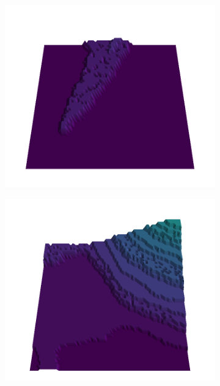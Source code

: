 \documentclass[../document.tex]{subfiles}
\begin{document}
\begin{figure}[H]
    \begin{subfigure}[b]{0.19\textwidth}
        \includegraphics[width=\linewidth]{../img/5/quarry/false_positive//patch-3d-majavi-colormap-0.png}
    \end{subfigure}
    \begin{subfigure}[b]{0.19\textwidth}
        \includegraphics[width=\linewidth]{../img/5/quarry/false_positive//patch-3d-majavi-colormap-1.png}
    \end{subfigure}  

\end{figure}
\end{document}
